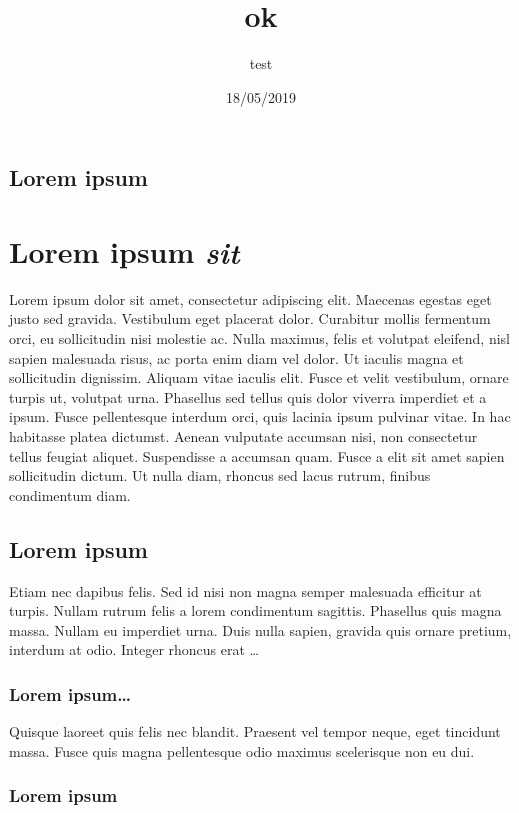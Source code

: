 \author{test}
\title{ok}
\date{18/05/2019}


\maketitle

\subsection{Lorem ipsum}

\section{Lorem ipsum \textit{sit}}

Lorem ipsum dolor sit amet, consectetur adipiscing elit. Maecenas egestas eget justo sed gravida. Vestibulum eget placerat dolor. Curabitur mollis fermentum orci, eu sollicitudin nisi molestie ac. Nulla maximus, felis et volutpat eleifend, nisl sapien malesuada risus, ac porta enim diam vel dolor. Ut iaculis magna et sollicitudin dignissim. Aliquam vitae iaculis elit. Fusce et velit vestibulum, ornare turpis ut, volutpat urna. Phasellus sed tellus quis dolor viverra imperdiet et a ipsum. Fusce pellentesque interdum orci, quis lacinia ipsum pulvinar vitae. In hac habitasse platea dictumst. Aenean vulputate accumsan nisi, non consectetur tellus feugiat aliquet. Suspendisse a accumsan quam. Fusce a elit sit amet sapien sollicitudin dictum. Ut nulla diam, rhoncus sed lacus rutrum, finibus condimentum diam. 

\subsection{Lorem ipsum}

Etiam nec dapibus felis. Sed id nisi non magna semper malesuada efficitur at turpis. Nullam rutrum felis a lorem condimentum sagittis. Phasellus quis magna massa. Nullam eu imperdiet urna. Duis nulla sapien, gravida quis ornare pretium, interdum at odio. Integer rhoncus erat 
\ldots

\subsubsection{Lorem ipsum\ldots}

Quisque laoreet quis felis nec blandit. Praesent vel tempor neque, eget tincidunt massa. Fusce quis magna pellentesque odio maximus scelerisque non eu dui.

\subsubsection{Lorem ipsum}

